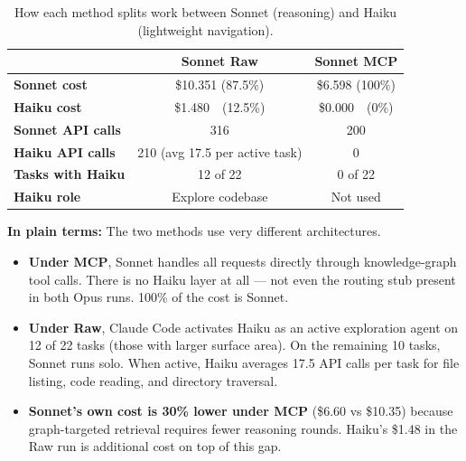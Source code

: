 \begin{table}[!htbp]
\centering
\caption{How each method splits work between Sonnet (reasoning) and
         Haiku (lightweight navigation).}\label{tab:model-cmp-sonnet}
\begin{tabular}{l cc}
\toprule
& \textbf{Sonnet Raw} & \textbf{Sonnet MCP} \\
\midrule
\textbf{Sonnet cost}       & \$10.351 (87.5\%) & \$6.598 (100\%) \\
\textbf{Haiku cost}        & \$1.480\ \ (12.5\%) & \$0.000\ \ (0\%) \\
\textbf{Sonnet API calls}  & 316               & 200 \\
\textbf{Haiku API calls}   & 210 (avg 17.5 per active task) & 0 \\
\textbf{Tasks with Haiku}  & 12 of 22          & 0 of 22 \\
\textbf{Haiku role}        & Explore codebase  & Not used \\
\bottomrule
\end{tabular}
\end{table}

\noindent
\textbf{In plain terms:} The two methods use very different architectures.

\begin{itemize}[nosep, leftmargin=*]

\item \textbf{Under MCP}, Sonnet handles all requests directly through
      knowledge-graph tool calls.  There is no Haiku layer at all ---
      not even the routing stub present in both Opus runs.
      100\% of the cost is Sonnet.

\item \textbf{Under Raw}, Claude Code activates Haiku as an active
      exploration agent on 12 of 22 tasks (those with larger surface
      area).  On the remaining 10 tasks, Sonnet runs solo.
      When active, Haiku averages 17.5 API calls per task for
      file listing, code reading, and directory traversal.

\item \textbf{Sonnet's own cost is 30\% lower under MCP} (\$6.60 vs
      \$10.35) because graph-targeted retrieval requires fewer
      reasoning rounds.  Haiku's \$1.48 in the Raw run is additional
      cost on top of this gap.

\end{itemize}

